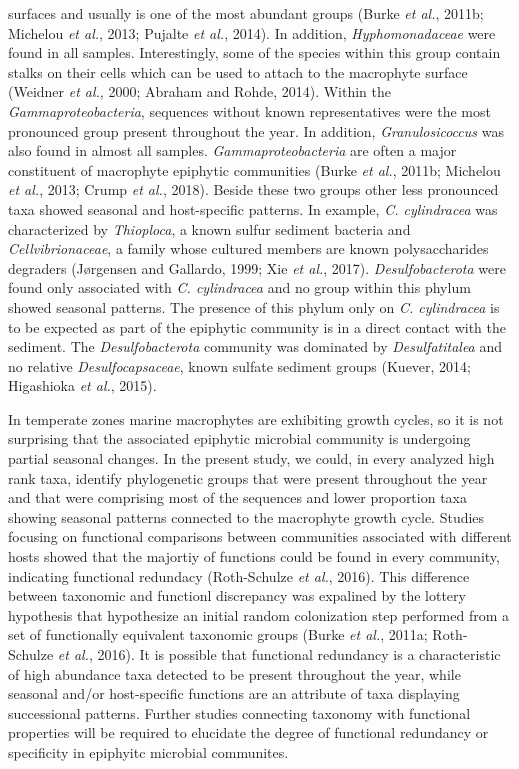 \documentclass[12pt,]{article}
\begin{document}
surfaces and usually is one of the most abundant groups (Burke \emph{et
al.}, 2011b; Michelou \emph{et al.}, 2013; Pujalte \emph{et al.}, 2014).
In addition, \emph{Hyphomonadaceae} were found in all samples.
Interestingly, some of the species within this group contain stalks on
their cells which can be used to attach to the macrophyte surface
(Weidner \emph{et al.}, 2000; Abraham and Rohde, 2014). Within the
\emph{Gammaproteobacteria}, sequences without known representatives were
the most pronounced group present throughout the year. In addition,
\emph{Granulosicoccus} was also found in almost all samples.
\emph{Gammaproteobacteria} are often a major constituent of macrophyte
epiphytic communities (Burke \emph{et al.}, 2011b; Michelou \emph{et
al.}, 2013; Crump \emph{et al.}, 2018). Beside these two groups other
less pronounced taxa showed seasonal and host-specific patterns. In
example, \emph{C. cylindracea} was characterized by \emph{Thioploca}, a
known sulfur sediment bacteria and \emph{Cellvibrionaceae}, a family
whose cultured members are known polysaccharides degraders (Jørgensen
and Gallardo, 1999; Xie \emph{et al.}, 2017). \emph{Desulfobacterota}
were found only associated with \emph{C. cylindracea} and no group
within this phylum showed seasonal patterns. The presence of this phylum
only on \emph{C. cylindracea} is to be expected as part of the epiphytic
community is in a direct contact with the sediment. The
\emph{Desulfobacterota} community was dominated by \emph{Desulfatitalea}
and no relative \emph{Desulfocapsaceae}, known sulfate sediment groups
(Kuever, 2014; Higashioka \emph{et al.}, 2015).

In temperate zones marine macrophytes are exhibiting growth cycles, so
it is not surprising that the associated epiphytic microbial community
is undergoing partial seasonal changes. In the present study, we could,
in every analyzed high rank taxa, identify phylogenetic groups that were
present throughout the year and that were comprising most of the
sequences and lower proportion taxa showing seasonal patterns connected
to the macrophyte growth cycle. Studies focusing on functional
comparisons between communities associated with different hosts showed
that the majortiy of functions could be found in every community,
indicating functional redundacy (Roth-Schulze \emph{et al.}, 2016). This
difference between taxonomic and functionl discrepancy was expalined by
the lottery hypothesis that hypothesize an initial random colonization
step performed from a set of functionally equivalent taxonomic groups
(Burke \emph{et al.}, 2011a; Roth-Schulze \emph{et al.}, 2016). It is
possible that functional redundancy is a characteristic of high
abundance taxa detected to be present throughout the year, while
seasonal and/or host-specific functions are an attribute of taxa
displaying successional patterns. Further studies connecting taxonomy
with functional properties will be required to elucidate the degree of
functional redundancy or specificity in epiphyitc microbial communites.
\end{document}
